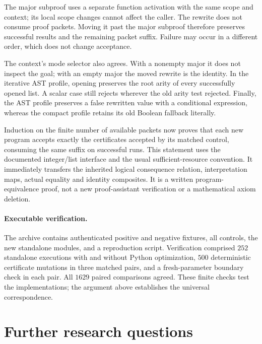\documentclass[11pt,letterpaper]{article}
\theoremstyle{definition}
\begin{document}
The major subproof uses a separate function activation with the same scope
and context; its local scope changes cannot affect the caller. The rewrite
does not consume proof packets. Moving it past the major subproof therefore
preserves successful results and the remaining packet suffix. Failure may
occur in a different order, which does not change acceptance.

The context's mode selector also agrees. With a nonempty major it does not
inspect the goal; with an empty major the moved rewrite is the identity.
In the iterative AST profile, opening preserves the root arity of every
successfully opened list. A scalar case still rejects wherever the old
arity test rejected. Finally, the AST profile preserves a false rewritten
value with a conditional expression, whereas the compact profile retains
its old Boolean fallback literally.

Induction on the finite number of available packets now proves that each
new program accepts exactly the certificates accepted by its matched
control, consuming the same suffix on successful runs. This statement uses
the documented integer/list interface and the usual sufficient-resource
convention. It immediately transfers the inherited logical consequence
relation, interpretation maps, actual equality and identity composites.
It is a written program-equivalence proof, not a new proof-assistant
verification or a mathematical axiom deletion.

\paragraph{Executable verification.}
The archive contains authenticated positive and negative fixtures, all
controls, the new standalone modules, and a reproduction script. Verification
comprised $252$ standalone executions with and without Python optimization,
$500$ deterministic certificate mutations in three matched pairs, and a
fresh-parameter boundary check in each pair. All $1629$ paired comparisons
agreed. These finite checks test the implementations; the argument above
establishes the universal correspondence.

\section{Further research questions}
\end{document}
